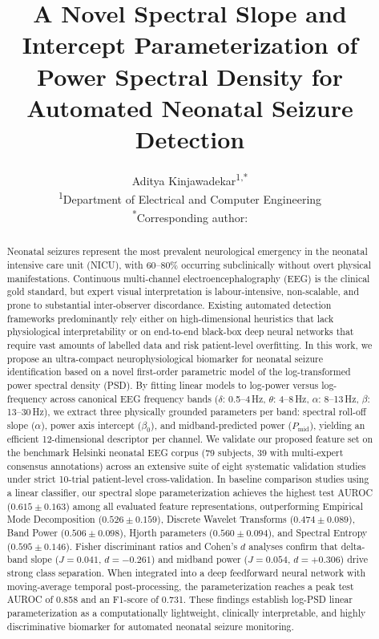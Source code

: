 \documentclass[10pt,twocolumn,letterpaper]{article}
\title{\textbf{\Large A Novel Spectral Slope and Intercept Parameterization of Power Spectral Density for Automated Neonatal Seizure Detection}}
\author{
  Aditya Kinjawadekar\textsuperscript{1,*} \\[0.5em]
  \small \textsuperscript{1}Department of Electrical and Computer Engineering \\
  \small \textsuperscript{*}Corresponding author: \email{adityakinjawadekar@gmail.com}
}
\date{}
\begin{document}
\maketitle

\begin{abstract}
\noindent Neonatal seizures represent the most prevalent neurological emergency in the neonatal intensive care unit (NICU), with 60--80\% occurring subclinically without overt physical manifestations. Continuous multi-channel electroencephalography (EEG) is the clinical gold standard, but expert visual interpretation is labour-intensive, non-scalable, and prone to substantial inter-observer discordance. Existing automated detection frameworks predominantly rely either on high-dimensional heuristics that lack physiological interpretability or on end-to-end black-box deep neural networks that require vast amounts of labelled data and risk patient-level overfitting. In this work, we propose an ultra-compact neurophysiological biomarker for neonatal seizure identification based on a novel first-order parametric model of the log-transformed power spectral density (PSD). By fitting linear models to log-power versus log-frequency across canonical EEG frequency bands ($\delta$: 0.5--4\,Hz, $\theta$: 4--8\,Hz, $\alpha$: 8--13\,Hz, $\beta$: 13--30\,Hz), we extract three physically grounded parameters per band: spectral roll-off slope ($\alpha$), power axis intercept ($\beta_0$), and midband-predicted power ($P_{\text{mid}}$), yielding an efficient 12-dimensional descriptor per channel. We validate our proposed feature set on the benchmark Helsinki neonatal EEG corpus (79 subjects, 39 with multi-expert consensus annotations) across an extensive suite of eight systematic validation studies under strict 10-trial patient-level cross-validation. In baseline comparison studies using a linear classifier, our spectral slope parameterization achieves the highest test AUROC ($0.615 \pm 0.163$) among all evaluated feature representations, outperforming Empirical Mode Decomposition ($0.526 \pm 0.159$), Discrete Wavelet Transforms ($0.474 \pm 0.089$), Band Power ($0.506 \pm 0.098$), Hjorth parameters ($0.560 \pm 0.094$), and Spectral Entropy ($0.595 \pm 0.146$). Fisher discriminant ratios and Cohen's $d$ analyses confirm that delta-band slope ($J = 0.041$, $d = -0.261$) and midband power ($J = 0.054$, $d = +0.306$) drive strong class separation. When integrated into a deep feedforward neural network with moving-average temporal post-processing, the parameterization reaches a peak test AUROC of 0.858 and an F1-score of 0.731. These findings establish log-PSD linear parameterization as a computationally lightweight, clinically interpretable, and highly discriminative biomarker for automated neonatal seizure monitoring.
\end{abstract}
\end{document}
